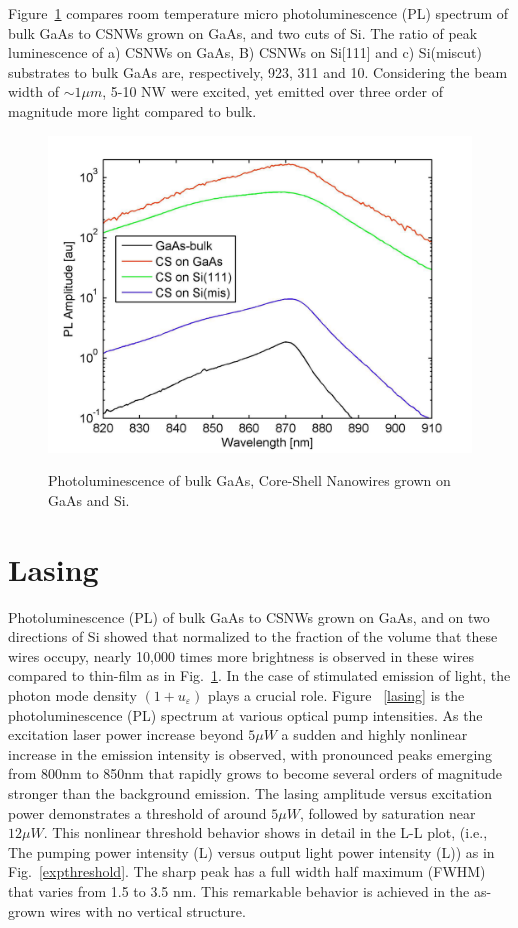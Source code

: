 Figure~\ref{PL} compares room temperature micro photoluminescence (PL) spectrum
of bulk GaAs to CSNWs grown on GaAs, and two cuts of Si. The ratio of peak
luminescence of a) CSNWs on GaAs, B) CSNWs on Si[111] and c) Si(miscut)
substrates to bulk GaAs are, respectively, 923, 311 and 10. Considering the
beam width of $\sim1{\mu}m$, 5-10 NW were excited, yet emitted over three
order of magnitude more light compared to bulk.

\begin{figure}
  \caption{Photoluminescence of bulk GaAs, Core-Shell Nanowires grown on GaAs and Si.}
  \centering
  \includegraphics[width=\textwidth]{pictures/Data/PL}
  \label{PL}
\end{figure}

\section{Lasing} \label{data_lasing}

Photoluminescence (PL) of bulk GaAs to CSNWs grown on GaAs, and on two
directions of Si showed that normalized to the fraction of the volume that
these wires occupy, nearly 10,000 times more brightness is observed in these
wires compared to thin-film as in Fig.~\ref{PL}. In the case of stimulated
emission of light, the photon mode density $(1+u_\varepsilon)$ plays a crucial
role. Figure ~\ref{lasing} is the photoluminescence (PL) spectrum at various
optical pump intensities. As the excitation laser power increase beyond
$5{\mu}W$ a sudden and highly nonlinear increase in the emission intensity is
observed, with pronounced peaks emerging from 800nm to 850nm that rapidly grows
to become several orders of magnitude stronger than the background emission.
The lasing amplitude versus excitation power demonstrates a threshold of around
$5{\mu}W$, followed by saturation near $12{\mu}W$. This nonlinear threshold
behavior shows in detail in the L-L plot, (i.e., The pumping power intensity
(L) versus output light power intensity (L)) as in Fig.~\ref{expthreshold}. The
sharp peak has a full width half maximum (FWHM) that varies from 1.5 to 3.5 nm.
This remarkable behavior is achieved in the as-grown wires with no vertical
structure.

